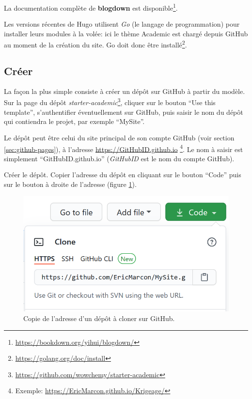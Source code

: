 \documentclass[
  12pt,
  french,
  a4paper,
  extrafontsizes,onecolumn,openright
  ]{memoir}
\begin{document}
La documentation complète de \textbf{blogdown} est disponible\footnote{\url{https://bookdown.org/yihui/blogdown/}}.

Les versions récentes de Hugo utilisent \emph{Go} (le langage de programmation) pour installer leurs modules à la volée: ici le thème Academic est chargé depuis GitHub au moment de la création du site.
Go doit donc être installé\footnote{\url{https://golang.org/doc/install}}.

\hypertarget{cruxe9er-2}{%
\subsection{Créer}\label{cruxe9er-2}}

La façon la plus simple consiste à créer un dépôt sur GitHub à partir du modèle.
Sur la page du dépôt \emph{starter-academic}\footnote{\url{https://github.com/wowchemy/starter-academic}}, cliquer sur le bouton \enquote{Use this template}, s'authentifier éventuellement sur GitHub, puis saisir le nom du dépôt qui contiendra le projet, par exemple \enquote{MySite}.

Le dépôt peut être celui du site principal de son compte GitHub (voir section \ref{sec:github-pages}), à l'adresse \url{https://GitHubID.github.io} \footnote{Exemple: \url{https://EricMarcon.github.io/Krigeage/}}.
Le nom à saisir est simplement \enquote{GitHubID.github.io} (\emph{GitHubID} est le nom du compte GitHub).

Créer le dépôt.
Copier l'adresse du dépôt en cliquant sur le bouton \enquote{Code} puis sur le bouton à droite de l'adresse (figure \ref{fig:rediger-GitHub-Clone}).



\scriptsize

\begin{figure}

{\centering \includegraphics[width=0.8\linewidth]{images/rediger-GitHub-Clone} 

}

\caption{Copie de l'adresse d'un dépôt à cloner sur GitHub.}\label{fig:rediger-GitHub-Clone}
\end{figure}
\end{document}
